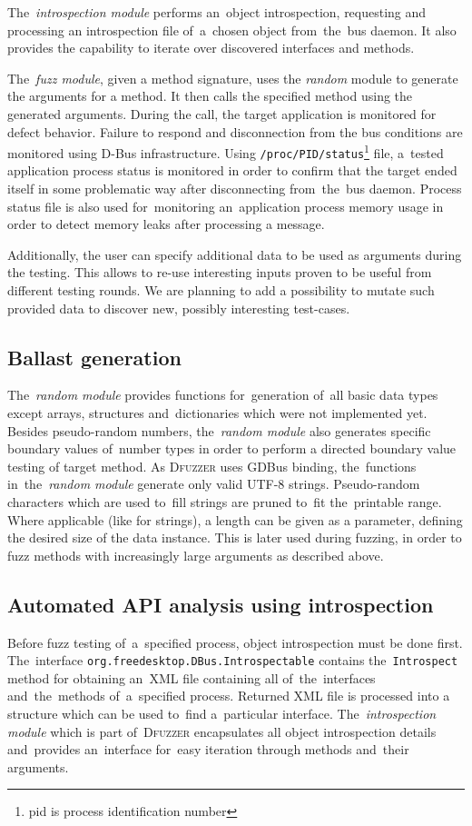 \documentclass[conference]{IEEEtran}
\begin{document}
The~\emph{introspection module} performs an~object
introspection, requesting and processing an introspection file of~a~chosen
object from~the~bus daemon. It also provides the capability to iterate over
discovered interfaces and methods.


The~\emph{fuzz module}, given a method signature, uses the \emph{random} module
to generate the arguments for a method. It then calls the specified method
using the generated arguments. During the call, the target application is
monitored for defect behavior. Failure to respond and disconnection from the
bus conditions are monitored using D-Bus infrastructure. Using
\texttt{/proc/PID/status}\footnote{pid is process identification number} file,
a~tested application process status is monitored in order to confirm that the
target ended itself in some problematic way after disconnecting from~the~bus
daemon. Process status file is also used for~monitoring an~application process
memory usage in order to detect memory leaks after processing a message.


Additionally, the user can specify additional data to be used as arguments
during the testing. This allows to re-use interesting inputs proven to be useful
from different testing rounds. We are planning to add a possibility to mutate
such provided data to discover new, possibly interesting test-cases.

\subsection{Ballast generation} The~\emph{random module} provides functions
for~generation of~all basic data types except arrays, structures
and~dictionaries which were not implemented yet. Besides pseudo-random numbers,
the~\emph{random module} also generates specific boundary values of~number
types in order to perform a directed boundary value testing of target method.
As \textsc{Dfuzzer} uses GDBus binding, the~functions in~the~\emph{random
module} generate only valid UTF-8 strings. Pseudo-random characters which are
used to~fill strings are pruned to~fit the~printable range. Where applicable
(like for strings), a length can be given as a parameter, defining the desired
size of the data instance. This is later used during fuzzing, in order to fuzz
methods with increasingly large arguments as described above.

\subsection{Automated API analysis using introspection}
Before fuzz testing of~a~specified process, object introspection must be done
first. The~interface \texttt{org.freedesktop.DBus.Introspectable} contains
the~\texttt{Introspect} method for obtaining an~XML file containing all
of~the~interfaces and~the~methods of~a~specified process. Returned XML file is
processed into a structure which can be used to~find a~particular interface.
The~\emph{introspection module} which is part of~\textsc{Dfuzzer} encapsulates all
object introspection details and~provides an~interface for~easy iteration
through methods and~their arguments.
\end{document}
